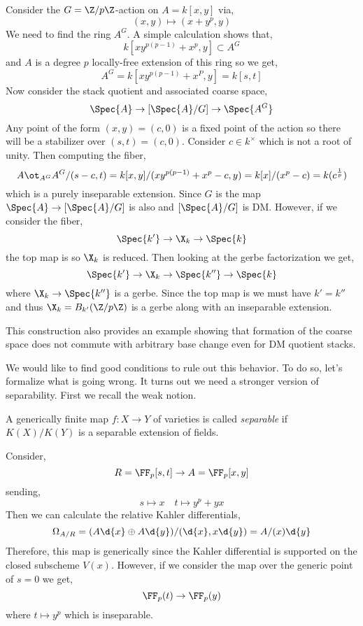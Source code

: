 \documentclass[12pt]{article}
\begin{document}
\begin{example}[Sean]
Consider the $G = \Z / p \Z$-action on $A = k[x,y]$ via,
\[ (x,y) \mapsto (x + y^p, y) \]
We need to find the ring $A^G$. A simple calculation shows that,
\[ k[x y^{p(p-1)} + x^p, y] \subset A^G \]
and $A$ is a degree $p$ locally-free extension of this ring so we get,
\[ A^G = k[x y^{p(p-1)} + x^P, y] = k[s,t] \]
Now consider the stack quotient and associated coarse space,
\[ \Spec{A} \to [\Spec{A}/G] \to \Spec{A^G} \]
Any point of the form $(x,y) = (c, 0)$ is a fixed point of the action so there will be a stabilizer over $(s,t) = (c, 0)$. Consider $c \in k^\times$ which is not a root of unity. Then computing the fiber,
\[ A \ot_{A^{G}} A^G/(s-c,t) = k[x,y]/(x y^{p(p-1)} + x^p - c, y) = k[x]/(x^p - c) = k(c^{\frac{1}{p}}) \]
which is a purely inseparable extension. Since $G$ is \etale the map $\Spec{A} \to [\Spec{A}/G]$ is also \etale and $[\Spec{A}/G]$ is DM. However, if we consider the fiber,
\[ \Spec{k'} \to \X_k \to \Spec{k} \]
the top map is \etale so $\X_k$ is reduced. Then looking at the gerbe factorization we get,
\[ \Spec{k'} \to \X_k \to \Spec{k''} \to \Spec{k} \] 
where $\X_k \to \Spec{k''}$ is a gerbe. Since the top map is \etale we must have $k' = k''$ and thus $\X_k = B_{k'} (\Z / p \Z)$ is a gerbe along with an inseparable extension.
\end{example}

\begin{rmk}
This construction also provides an example showing that formation of the coarse space does not commute with arbitrary base change even for DM quotient stacks. 
\end{rmk}


\begin{rmk}
We would like to find good conditions to rule out this behavior. To do so, let's formalize what is going wrong. It turns out we need a stronger version of separability. First we recall the weak notion.
\end{rmk}

\begin{defn}
A generically finite map $f : X \to Y$ of varieties is called \textit{separable} if $K(X) / K(Y)$ is a separable extension of fields. 
\end{defn}

\begin{example}
Consider,
\[ R = \FF_p[s,t] \to A = \FF_p[x,y] \]
sending,
\[ s \mapsto x \quad t \mapsto y^p + yx \]
Then we can calculate the relative Kahler differentials,
\[ \Omega_{A/R} = (A \d{x} \oplus A \d{y})/(\d{x}, x \d{y}) = A/(x) \d{y} \]
Therefore, this map is generically \etale since the Kahler differential is supported on the closed subscheme $V(x)$. However, if we consider the map over the generic point of $s = 0$ we get,
\[ \FF_p(t) \to \FF_p(y) \]
where $t \mapsto y^p$ which is inseparable.
\end{example}
\end{document}

